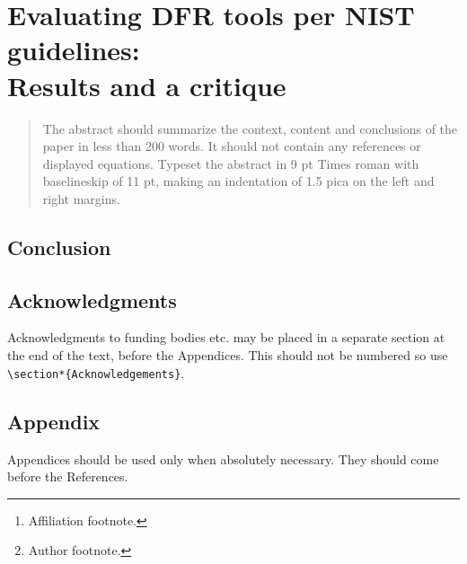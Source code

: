 \documentclass{ws-rv9x6}
\begin{document}
\chapter[Evaluating DFR tools per NIST guidelines]{Evaluating DFR tools per NIST guidelines:\\ Results and a critique \label{ra_ch1}}

\author[A. Meyer and S. Roy]{Andrew Meyer and S. Roy\footnote{Author footnote.}}

\address{Computer Science Department, BGSU,\\
Bowling Green, Ohio, USA 43403, \\
apmeyer@bgsu.edu\footnote{Affiliation footnote.}}
 
\begin{abstract}
The abstract should summarize the context, content and conclusions of
the paper in less than 200 words. It should not contain any references
or displayed equations. Typeset the abstract in 9 pt Times roman with
baselineskip of 11 pt, making an indentation of 1.5 pica on the left
and right margins.
\end{abstract}


\body








\section{Conclusion}\label{conclusion}

\section{Acknowledgments}
Acknowledgments to funding bodies etc. may be placed in a separate
section at the end of the text, before the Appendices. This should not
be numbered so use \verb|\section*{Acknowledgements}|.

\section{Appendix}
Appendices should be used only when absolutely necessary. They
should come before the References.





\end{document}
